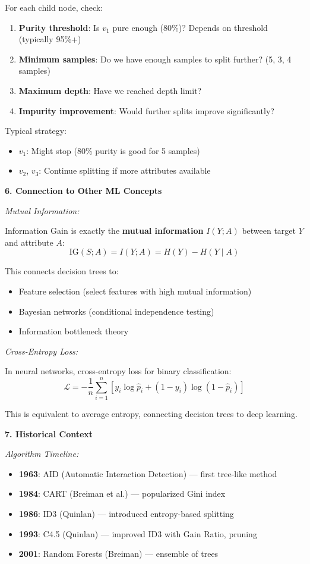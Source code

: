 \documentclass[12pt]{article}
\begin{document}
\begin{explanation}
For each child node, check:
\begin{enumerate}
    \item \textbf{Purity threshold}: Is $v_1$ pure enough (80\%)? Depends on threshold (typically 95\%+)
    \item \textbf{Minimum samples}: Do we have enough samples to split further? (5, 3, 4 samples)
    \item \textbf{Maximum depth}: Have we reached depth limit?
    \item \textbf{Impurity improvement}: Would further splits improve significantly?
\end{enumerate}

Typical strategy:
\begin{itemize}
    \item $v_1$: Might stop (80\% purity is good for 5 samples)
    \item $v_2$, $v_3$: Continue splitting if more attributes available
\end{itemize}

\textbf{6. Connection to Other ML Concepts}

\textit{Mutual Information:}

Information Gain is exactly the \textbf{mutual information} $I(Y; A)$ between target $Y$ and attribute $A$:
\[
\text{IG}(S; A) = I(Y; A) = H(Y) - H(Y \mid A)
\]

This connects decision trees to:
\begin{itemize}
    \item Feature selection (select features with high mutual information)
    \item Bayesian networks (conditional independence testing)
    \item Information bottleneck theory
\end{itemize}

\textit{Cross-Entropy Loss:}

In neural networks, cross-entropy loss for binary classification:
\[
\mathcal{L} = -\frac{1}{n}\sum_{i=1}^n [y_i \log \hat{p}_i + (1-y_i) \log(1-\hat{p}_i)]
\]

This is equivalent to average entropy, connecting decision trees to deep learning.

\textbf{7. Historical Context}

\textit{Algorithm Timeline:}

\begin{itemize}
    \item \textbf{1963}: AID (Automatic Interaction Detection) — first tree-like method
    \item \textbf{1984}: CART (Breiman et al.) — popularized Gini index
    \item \textbf{1986}: ID3 (Quinlan) — introduced entropy-based splitting
    \item \textbf{1993}: C4.5 (Quinlan) — improved ID3 with Gain Ratio, pruning
    \item \textbf{2001}: Random Forests (Breiman) — ensemble of trees
\end{itemize}


\end{explanation}
\end{document}
